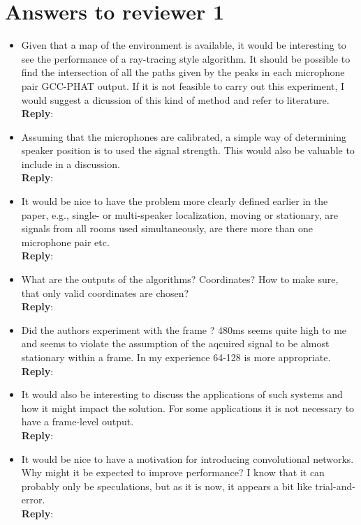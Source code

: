 \documentclass[11pt, technote, letterpaper, oneside, onecolumn]{IEEEtran}
\begin{document}
\section{Answers to reviewer 1}\label{sec:rev1}
\begin{itemize}
\item Given that a map of the environment is available, it would be interesting to see the performance of a ray-tracing style algorithm. It should be possible to find the intersection of all the paths given by the peaks in each microphone pair GCC-PHAT output. If it is not feasible to carry out this experiment, I would suggest a dicussion of this kind of method and refer to literature.\\
\textbf{Reply}:

\item Assuming that the microphones are calibrated, a simple way of determining speaker position is to used the signal strength. This would also be valuable to include in a discussion.\\
\textbf{Reply}:

\item It would be nice to have the problem more clearly defined earlier in the paper, e.g., single- or multi-speaker localization, moving or stationary, are signals from all rooms used simultaneously, are there more than one microphone pair etc.\\
\textbf{Reply}:

\item What are the outputs of the algorithms? Coordinates? How to make sure, that only valid coordinates are chosen?\\
\textbf{Reply}:

\item Did the authors experiment with the frame ? 480ms seems quite high to me and seems to violate the assumption of the aqcuired signal to be almost stationary within a frame. In my experience 64-128 is more appropriate.\\
\textbf{Reply}:

\item It would also be interesting to discuss the applications of such systems and how it might impact the solution. For some applications it is not necessary to have a frame-level output.\\
\textbf{Reply}:

\item It would be nice to have a motivation for introducing convolutional networks. Why might it be expected to improve performance? I know that it can probably only be speculations, but as it is now, it appears a bit like trial-and-error.\\
\textbf{Reply}:


\end{itemize}
\end{document}
